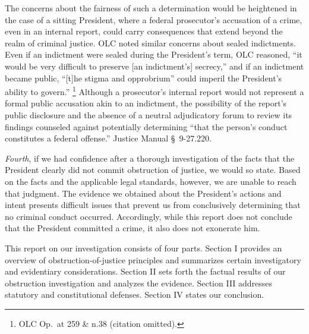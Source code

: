 The concerns about the fairness of such a determination would be heightened in the case of a sitting President, where a federal prosecutor’s accusation of a crime, even in an internal report, could carry consequences that extend beyond the realm of criminal justice.
OLC noted similar concerns about sealed indictments.
Even if an indictment were sealed during the President’s term, OLC reasoned, “it would be very difficult to preserve [an indictment’s] secrecy,” and if an indictment became public, “[t]he stigma and opprobrium” could imperil the President’s ability to govern.”%
\footnote{OLC Op.\ at 259 \& n.38 (citation omitted).}
Although a prosecutor’s internal report would not represent a formal public accusation akin to an indictment, the possibility of the report’s public disclosure and the absence of a neutral adjudicatory forum to review its findings counseled against potentially determining “that the person’s conduct constitutes a federal offense.”
Justice Manual \S~9-27.220.

\textit{Fourth}, if we had confidence after a thorough investigation of the facts that the President clearly did not commit obstruction of justice, we would so state.
Based on the facts and the applicable legal standards, however, we are unable to reach that judgment.
The evidence we obtained about the President’s actions and intent presents difficult issues that prevent us from
conclusively determining that no criminal conduct occurred.
Accordingly, while this report does not conclude that the President committed a crime, it also does not exonerate him.

\hr

This report on our investigation consists of four parts.
Section I provides an overview of obstruction-of-justice principles and summarizes certain investigatory and evidentiary considerations.
Section II sets forth the factual results of our obstruction investigation and analyzes the evidence.
Section III addresses statutory and constitutional defenses.
Section IV states our conclusion.
